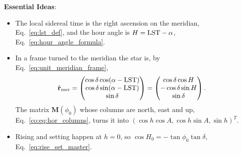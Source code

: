 \textbf{Essential Ideas}:
\begin{itemize}
	\item The local sidereal time is the right ascension on the meridian, Eq.~\eqref{eq:lst_def}, and the hour angle is $H=\mathrm{LST}-\alpha$, Eq.~\eqref{eq:hour_angle_formula}.
	\item In a frame turned to the meridian the star is, by Eq.~\eqref{eq:unit_meridian_frame},
	\begin{equation}
		\hat{\mathbf r}_{\rm mer}=\begin{pmatrix}\cos\delta\cos(\alpha-\mathrm{LST})\\ \cos\delta\sin(\alpha-\mathrm{LST})\\ \sin\delta\end{pmatrix}=\begin{pmatrix}\cos\delta\cos H\\ -\cos\delta\sin H\\ \sin\delta\end{pmatrix}.
		\label{eq:ch2_prob_unit_r}
	\end{equation}
	The matrix $\mathbf M(\phi_0)$ whose columns are north, east and up, Eq.~\eqref{co:eq:hor_columns}, turns it into $(\cos h\cos A,\cos h\sin A,\sin h)^T$.
	\item Rising and setting happen at $h=0$, so $\cos H_0=-\tan\phi_0\tan\delta$, Eq.~\eqref{eq:rise_set_master}.
\end{itemize}

